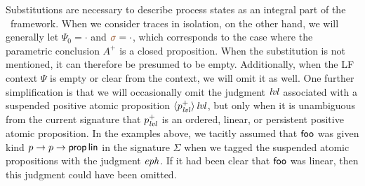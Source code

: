 Substitutions are necessary to describe process states as an integral
part of the \sls~framework. When we consider traces in
isolation, on the other hand,
we will generally let $\Psi_0 = \cdot$ and $\lf{\sigma} =
\cdot$, which corresponds to the case where the parametric conclusion
$A^+$ is a closed proposition. When the substitution is not mentioned,
it can therefore be presumed to be empty. Additionally, when the LF
context $\Psi$ is empty or clear from the context, we will omit it as
well. One further simplification is that we will occasionally omit the
judgment ${\it lvl}$ associated with a suspended positive atomic
proposition ${\langle {p^+_{\it lvl}} \rangle}\,{{\it lvl}}$, but only when it is
unambiguous from the current signature that $p^+_{\it lvl}$ is an ordered,
linear, or persistent positive atomic proposition. In the examples
above, we tacitly assumed that ${\sf foo}$ was given kind $p
\rightarrow p \rightarrow {\sf prop}\,{\sf lin}$ in the signature
$\Sigma$ when we tagged the suspended atomic propositions with the
judgment ${\it eph}$. If it had been clear that ${\sf foo}$ was linear,
then this judgment could have been omitted.


